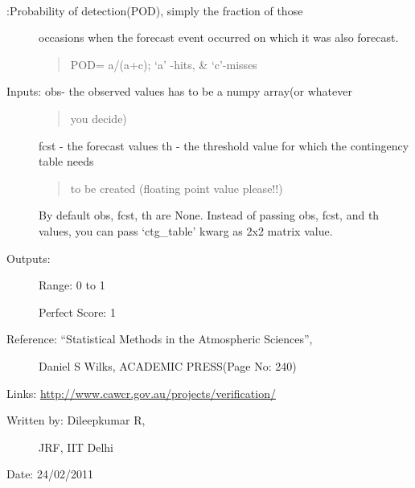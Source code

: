 \documentclass[letterpaper,10pt,english]{sphinxmanual}
\begin{document}

\begin{fulllineitems}
\label{diagnosis:ctgfunction.pod}~\begin{description}
\item[{{\hyperref[diagnosis:ctgfunction.pod]{}}:Probability of detection(POD), simply the fraction of those}] \leavevmode
occasions when the forecast event occurred on which it was also
forecast.
\begin{quote}

POD= a/(a+c); `a' -hits, \& `c'-misses
\end{quote}

\item[{Inputs: obs- the observed values has to be a numpy array(or whatever}] \leavevmode\begin{quote}

you decide)
\end{quote}

fcst - the forecast values
th  - the threshold value for which the contingency table needs
\begin{quote}

to be created (floating point value please!!)
\end{quote}

By default obs, fcst, th are None. Instead of passing obs, fcst,
and th values, you can pass `ctg\_table' kwarg as 2x2 matrix value.

\item[{Outputs:}] \leavevmode
Range: 0 to 1

Perfect Score: 1

\item[{Reference: ``Statistical Methods in the Atmospheric Sciences'',}] \leavevmode
Daniel S Wilks, ACADEMIC PRESS(Page No: 240)

\end{description}

Links: \href{http://www.cawcr.gov.au/projects/verification/}{http://www.cawcr.gov.au/projects/verification/}
\begin{description}
\item[{Written by: Dileepkumar R,}] \leavevmode
JRF, IIT Delhi

\end{description}

Date: 24/02/2011

\end{fulllineitems}
\end{document}
